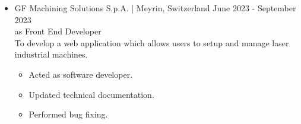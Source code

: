\documentclass[english,10pt,a4paper]{article}
\newcommand{\Color}[1]{\textcolor{CvColor}{#1}}
\newcommand{\SubCompanyName}[1]{\textcolor{CvIcon}{{\footnotesize \textsf{#1}}}}
\newcommand{\JobTimeRange}[1]{{\scriptsize \textcolor{CvColor!50}{\faCalendar*} \hspace{0.01cm} \textcolor{CvIcon}{#1}}}
\newcommand{\CvCheck}{\textcolor{CvColor}{\faCheck}}
\begin{document}
\begin{paracol}{2}
\begin{tcolorbox}[colback=white, height=\textheight, colframe=white, left=0cm]
\begin{itemize}
{\begin{itemize}
					\textcolor{CvColor}{Results:}
					\begin{itemize}
						\item Improved reliability of released software introducing several unit and integration tests.
						\item Improved user interface of developed software. 
						\item Designed and released several libraries in order to reduce time and cost development.
						\item Deadlines met.
					\end{itemize}
					
					\textcolor{CvColor}{Acquired skills:}
					\begin{itemize}
						\item[\CvCheck] I acquired an extensive knowledge about \Color{Windows Presentation Foundation} (WPF). 
						\item[\CvCheck] I started to interact with \Color{Microsoft Active Directory} and \Color{LDAP} protocol integrating them with developed software.
						\item[\CvCheck] Improved knowledge about \Color{\texttt{git}}, \Color{Jenkins pipelines}, \Color{GitLab}, \Color{SonarQube} and \Color{Microsoft SQL Server}.
					
					\end{itemize}
					
					\vspace*{0.2cm}
					\item \SubCompanyName{GF Machining Solutions S.p.A.} \textcolor{CvColor}{|} {\scriptsize Meyrin, Switzerland} \hfill \JobTimeRange{June 2023 - September 2023}\\	
					{\scriptsize \textcolor{CvIcon}{as} \textcolor{CvColor}{Front End Developer}}\\		
					
					To develop a web application which allows users to setup and manage laser industrial machines.
					
					\begin{itemize}
						\item Acted as software developer.
						\item Updated technical documentation.
						\item Performed bug fixing.
					\end{itemize}
					

\end{itemize}}
\end{itemize}
\end{tcolorbox}
\end{paracol}
\end{document}
